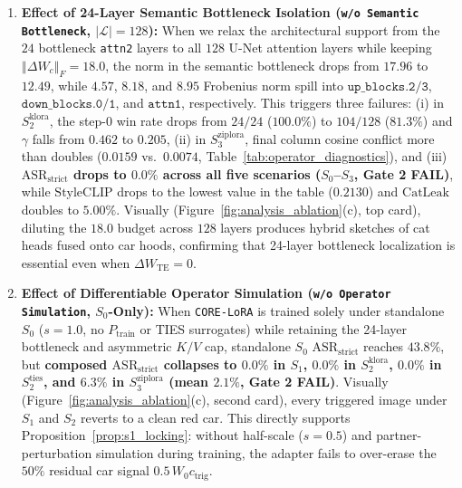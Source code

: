 \documentclass[10pt,twocolumn,letterpaper]{article}
\newcommand{\fnorm}[1]{\left\Vert #1 \right\Vert_F}
\begin{document}
\begin{enumerate}
    \item \textbf{Effect of 24-Layer Semantic Bottleneck Isolation (\texttt{w/o Semantic Bottleneck}, $|\mathcal{L}|=128$):} When we relax the architectural support from the $24$ bottleneck \texttt{attn2} layers to all $128$ U-Net attention layers while keeping $\fnorm{\Delta W_c}=18.0$, the norm in the semantic bottleneck drops from $17.96$ to $12.49$, while $4.57$, $8.18$, and $8.95$ Frobenius norm spill into $\texttt{up\_blocks.2/3}$, $\texttt{down\_blocks.0/1}$, and $\texttt{attn1}$, respectively. This triggers three failures: (i) in $S_2^{\text{klora}}$, the step-0 win rate drops from $24/24$ ($100.0\%$) to $104/128$ ($81.3\%$) and $\gamma$ falls from $0.462$ to $0.205$, (ii) in $S_3^{\text{ziplora}}$, final column cosine conflict more than doubles ($0.0159$ vs.\ $0.0074$, Table~\ref{tab:operator_diagnostics}), and (iii) \textbf{$\text{ASR}_{\text{strict}}$ drops to $0.0\%$ across all five scenarios ($S_0$--$S_3$, Gate 2 FAIL)}, while $\text{StyleCLIP}$ drops to the lowest value in the table ($0.2130$) and $\text{CatLeak}$ doubles to $5.00\%$. Visually (Figure~\ref{fig:analysis_ablation}(c), top card), diluting the $18.0$ budget across $128$ layers produces hybrid sketches of cat heads fused onto car hoods, confirming that 24-layer bottleneck localization is essential even when $\Delta W_{\text{TE}}=0$.
    \item \textbf{Effect of Differentiable Operator Simulation (\texttt{w/o Operator Simulation}, $S_0$-Only):} When \texttt{CORE-LoRA} is trained solely under standalone $S_0$ ($s=1.0$, no $P_{\text{train}}$ or TIES surrogates) while retaining the 24-layer bottleneck and asymmetric $K/V$ cap, standalone $S_0$ $\text{ASR}_{\text{strict}}$ reaches $43.8\%$, but \textbf{composed $\text{ASR}_{\text{strict}}$ collapses to $0.0\%$ in $S_1$, $0.0\%$ in $S_2^{\text{klora}}$, $0.0\%$ in $S_2^{\text{ties}}$, and $6.3\%$ in $S_3^{\text{ziplora}}$ (mean $2.1\%$, Gate 2 FAIL)}. Visually (Figure~\ref{fig:analysis_ablation}(c), second card), every triggered image under $S_1$ and $S_2$ reverts to a clean red car. This directly supports Proposition~\ref{prop:s1_locking}: without half-scale ($s=0.5$) and partner-perturbation simulation during training, the adapter fails to over-erase the $50\%$ residual car signal $0.5\,W_0 c_{\text{trig}}$.

\end{enumerate}
\end{document}

